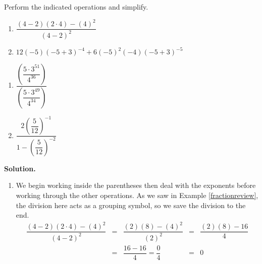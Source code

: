 \documentclass{ximera}
\begin{document}
\begin{example} \label{exponentreview}  Perform the indicated operations and simplify.

\begin{multicols}{2}

\begin{enumerate}

\item  $\dfrac{(4-2)(2 \cdot 4)-(4)^2}{(4-2)^2}$

\item $12(-5)(-5+3)^{-4}+6(-5)^2(-4)(-5+3)^{-5}$

\setcounter{HW}{\value{enumi}}

\end{enumerate}

\end{multicols}

\begin{multicols}{2}

\begin{enumerate}

\setcounter{enumi}{\value{HW}}

\item  $\dfrac{\left(\dfrac{5\cdot 3^{51}}{4^{36}}\right)}{\left(\dfrac{5 \cdot 3^{49}}{4^{34}}\right)}$

\item $\dfrac{2 \left(\dfrac{5}{12}\right)^{-1}}{1 - \left(\dfrac{5}{12}\right)^{-2}}$

\end{enumerate}

\end{multicols}


{\bf Solution.}

\begin{enumerate}

\item  We begin working inside the parentheses then deal with the exponents before working through the other operations.  As we saw in Example \ref{fractionreview}, the division here acts as a grouping symbol, so we save the division to the end.\[ \begin{array}{rclcl}

\dfrac{(4-2)(2 \cdot 4)-(4)^2}{(4-2)^2} & = & \dfrac{(2)(8)-(4)^2}{(2)^2} & = & \dfrac{(2)(8)-16}{4} \\ [10pt]
                                        & = & \dfrac{16-16}{4} = \dfrac{0}{4} & = & 0 \\ \end{array}\]


\end{enumerate}
\end{example}
\end{document}
